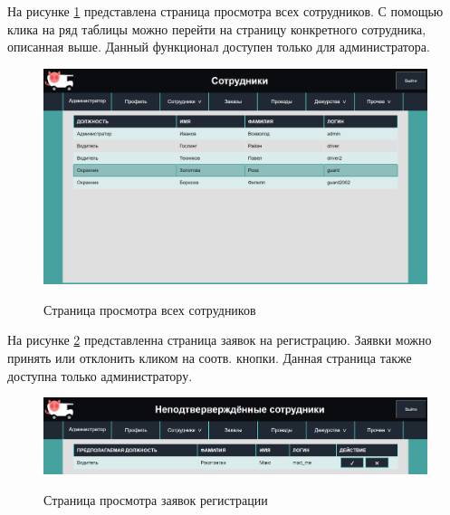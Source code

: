 На рисунке \ref{sc:all_profiles} представлена страница просмотра всех сотрудников. С помощью клика на ряд таблицы можно перейти на страницу конкретного сотрудника, описанная выше. Данный функционал доступен только для администратора.
\begin{figure}[h!] 
	\begin{center}
		{\includegraphics[scale=0.45, angle=0]{sc/all_profiles}}
		\caption{Страница просмотра всех сотрудников}
		\label{sc:all_profiles}
	\end{center}
\end{figure}

На рисунке \ref{sc:unver} представленна страница заявок на регистрацию. Заявки можно принять или отклонить кликом на соотв. кнопки. Данная страница также доступна только администратору. 
\begin{figure}[h!] 
	\begin{center}
		{\includegraphics[scale=0.43, angle=0]{sc/unver}}
		\caption{Страница просмотра заявок регистрации}
		\label{sc:unver}
	\end{center}
\end{figure}

